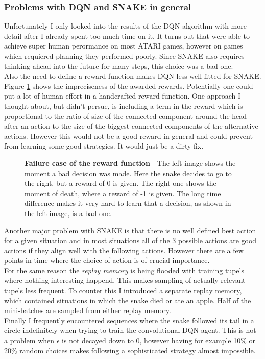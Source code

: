 \documentclass{article}
\begin{document}
\subsubsection{Problems with DQN and SNAKE in general}
\label{dqnProblems}
Unfortunately I only looked into the results of the DQN algorithm with more detail after I already spent too much time on it. It turns out that \cite{atari} were able to achieve super human perormance on most ATARI games, however on games which requiered planning they performed poorly. Since SNAKE also requires thinking ahead into the future for many steps, this choice was a bad one. \\
Also the need to define a reward function makes DQN less well fitted for SNAKE.
Figure \ref{rewardFailure}
 shows the impreciseness of the awarded rewards. Potentially one could put a lot of human effort in a handcrafted reward function. One approach I thought about, but didn't persue, is including a term in the reward which is proportional to the ratio of size of the connected component around the head after an action to the size of the biggest connected components of the alternative actions. However this would not be a good reward in general and could prevent from learning some good strategies. It would just be a dirty fix. \\
 \begin{figure}
 	\centering
 	\qquad
 	\caption{\small \textbf{Failure case of the reward function} - The left image shows the moment a bad decision was made. Here the snake decides to go to the right, but a reward of 0 is given. The right one shows the moment of death, where a reward of -1 is given. The long time difference makes it very hard to learn that a decision, as shown in the left image, is a bad one.}
 	\label{rewardFailure}
 \end{figure} 

Another major problem with SNAKE is that there is no well defined best action for a given situation and in most situations all of the 3 possible actions are good actions if they align well with the following actions. However there are a few points in time where the choice of action is of crucial importance. \\
For the same reason the \emph{replay memory} is being flooded with training tupels where nothing interesting happend. This makes sampling of actually relevant tupels less frequent. To counter this I introduced a separate replay memory, which contained situations in which the snake died or ate an apple. Half of the mini-batches are sampled from either replay memory.\\
Finally I frequently encountered sequences where the snake followed its tail in a circle indefinitely when trying to train the convolutional DQN agent. This is not a problem when $\epsilon$ is not decayed down to 0, however having for example 10\% or 20\% random choices makes following a sophisticated strategy almost impossible.
\end{document}
